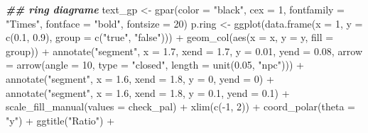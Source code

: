 \documentclass[
]{article}
\newenvironment{Shaded}{\begin{snugshade}}{\end{snugshade}}
\newcommand{\AttributeTok}[1]{\textcolor[rgb]{0.77,0.63,0.00}{#1}}
\newcommand{\DecValTok}[1]{\textcolor[rgb]{0.00,0.00,0.81}{#1}}
\newcommand{\DocumentationTok}[1]{\textcolor[rgb]{0.56,0.35,0.01}{\textbf{\textit{#1}}}}
\newcommand{\FloatTok}[1]{\textcolor[rgb]{0.00,0.00,0.81}{#1}}
\newcommand{\FunctionTok}[1]{\textcolor[rgb]{0.00,0.00,0.00}{#1}}
\newcommand{\NormalTok}[1]{#1}
\newcommand{\OtherTok}[1]{\textcolor[rgb]{0.56,0.35,0.01}{#1}}
\newcommand{\SpecialCharTok}[1]{\textcolor[rgb]{0.00,0.00,0.00}{#1}}
\newcommand{\StringTok}[1]{\textcolor[rgb]{0.31,0.60,0.02}{#1}}
\begin{document}
\begin{Shaded}
\begin{Highlighting}[]
\DocumentationTok{\#\# ring diagrame}
\NormalTok{text\_gp }\OtherTok{\textless{}{-}} \FunctionTok{gpar}\NormalTok{(}\AttributeTok{color =} \StringTok{"black"}\NormalTok{, }\AttributeTok{cex =} \DecValTok{1}\NormalTok{, }\AttributeTok{fontfamily =} \StringTok{"Times"}\NormalTok{, }\AttributeTok{fontface =} \StringTok{"bold"}\NormalTok{,}
  \AttributeTok{fontsize =} \DecValTok{20}\NormalTok{)}
\NormalTok{p.ring }\OtherTok{\textless{}{-}} \FunctionTok{ggplot}\NormalTok{(}\FunctionTok{data.frame}\NormalTok{(}\AttributeTok{x =} \DecValTok{1}\NormalTok{, }\AttributeTok{y =} \FunctionTok{c}\NormalTok{(}\FloatTok{0.1}\NormalTok{, }\FloatTok{0.9}\NormalTok{), }\AttributeTok{group =} \FunctionTok{c}\NormalTok{(}\StringTok{"true"}\NormalTok{, }\StringTok{"false"}\NormalTok{))) }\SpecialCharTok{+}
  \FunctionTok{geom\_col}\NormalTok{(}\FunctionTok{aes}\NormalTok{(}\AttributeTok{x =}\NormalTok{ x, }\AttributeTok{y =}\NormalTok{ y, }\AttributeTok{fill =}\NormalTok{ group)) }\SpecialCharTok{+}
  \FunctionTok{annotate}\NormalTok{(}\StringTok{"segment"}\NormalTok{, }\AttributeTok{x =} \FloatTok{1.7}\NormalTok{, }\AttributeTok{xend =} \FloatTok{1.7}\NormalTok{, }\AttributeTok{y =} \FloatTok{0.01}\NormalTok{, }\AttributeTok{yend =} \FloatTok{0.08}\NormalTok{,}
    \AttributeTok{arrow =} \FunctionTok{arrow}\NormalTok{(}\AttributeTok{angle =} \DecValTok{10}\NormalTok{, }\AttributeTok{type =} \StringTok{"closed"}\NormalTok{, }\AttributeTok{length =} \FunctionTok{unit}\NormalTok{(}\FloatTok{0.05}\NormalTok{, }\StringTok{"npc"}\NormalTok{))) }\SpecialCharTok{+}
  \FunctionTok{annotate}\NormalTok{(}\StringTok{"segment"}\NormalTok{, }\AttributeTok{x =} \FloatTok{1.6}\NormalTok{, }\AttributeTok{xend =} \FloatTok{1.8}\NormalTok{, }\AttributeTok{y =} \DecValTok{0}\NormalTok{, }\AttributeTok{yend =} \DecValTok{0}\NormalTok{) }\SpecialCharTok{+}
  \FunctionTok{annotate}\NormalTok{(}\StringTok{"segment"}\NormalTok{, }\AttributeTok{x =} \FloatTok{1.6}\NormalTok{, }\AttributeTok{xend =} \FloatTok{1.8}\NormalTok{, }\AttributeTok{y =} \FloatTok{0.1}\NormalTok{, }\AttributeTok{yend =} \FloatTok{0.1}\NormalTok{) }\SpecialCharTok{+}
  \FunctionTok{scale\_fill\_manual}\NormalTok{(}\AttributeTok{values =}\NormalTok{ check\_pal) }\SpecialCharTok{+}
  \FunctionTok{xlim}\NormalTok{(}\FunctionTok{c}\NormalTok{(}\SpecialCharTok{{-}}\DecValTok{1}\NormalTok{, }\DecValTok{2}\NormalTok{)) }\SpecialCharTok{+}
  \FunctionTok{coord\_polar}\NormalTok{(}\AttributeTok{theta =} \StringTok{"y"}\NormalTok{) }\SpecialCharTok{+}
  \FunctionTok{ggtitle}\NormalTok{(}\StringTok{"Ratio"}\NormalTok{) }\SpecialCharTok{+}

\end{Highlighting}
\end{Shaded}
\end{document}
